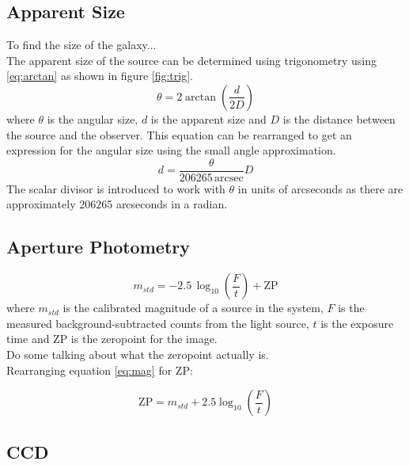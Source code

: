 \documentclass[%
reprint,
amsmath,amssymb,
aps,
]{revtex4-2}
\begin{document}
		\subsection{Apparent Size}
			To find the size of the galaxy...\\
			
			
			The apparent size of the source can be determined using trigonometry using \ref{eq:arctan} as shown in figure \ref{fig:trig}.
			\begin{equation}
				\theta = 2 \arctan{\left(\frac{d}{2 D}\right)}
				\label{eq:arctan}
			\end{equation}where $\theta$ is the angular size, $d$ is the apparent size and $D$ is the distance between the source and the observer. This equation can be rearranged to get an expression for the angular size using the small angle approximation.
			\begin{equation}
				d = \frac{\theta}{206265\,\text{arcsec}} D
				\label{eq:angSize}
			\end{equation}The scalar divisor is introduced to work with $\theta$ in units of arcseconds as there are approximately 206265 arcseconds in a radian\cite{modernAstro}.
		
		\subsection{Aperture Photometry}
		
			\begin{equation}
				m_{std} = -2.5 \, \log_{10}\left(\frac{F}{t}\right) + \text{ZP}
				\label{eq:mag}
			\end{equation} where $m_{std}$ is the calibrated magnitude of a source in the system, $F$ is the measured background-subtracted counts from the light source, $t$ is the exposure time and $\text{ZP}$ is the zeropoint for the image.\\
		
			Do some talking about what the zeropoint actually is.\\
			
			Rearranging equation \ref{eq:mag} for $\text{ZP}$:
			
			\begin{equation}
				\text{ZP} = m_{std} + 2.5 \log_{10}\left(\frac{F}{t}\right)
				\label{eq:zeropoint}
			\end{equation}
		
		\subsection{CCD}
		
\end{document}
